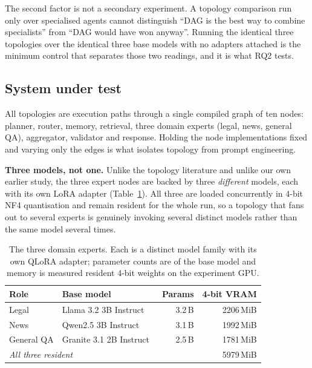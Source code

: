 \documentclass[journal,10pt,compsoc,onecolumn]{IEEEtran}
\begin{document}
The second factor is not a secondary experiment. A topology comparison run only
over specialised agents cannot distinguish ``DAG is the best way to combine
specialists'' from ``DAG would have won anyway''. Running the identical three
topologies over the identical three base models with no adapters attached is the
minimum control that separates those two readings, and it is what RQ2 tests.

\subsection{System under test}
All topologies are execution paths through a single compiled graph of ten nodes:
planner, router, memory, retrieval, three domain experts (legal, news, general
QA), aggregator, validator and response. Holding the node implementations fixed
and varying only the edges is what isolates topology from prompt engineering.

\textbf{Three models, not one.} Unlike the topology literature and unlike our own
earlier study, the three expert nodes are backed by three \emph{different}
models, each with its own LoRA adapter (Table~\ref{tab:experts}). All three are
loaded concurrently in 4-bit NF4 quantisation and remain resident for the whole
run, so a topology that fans out to several experts is genuinely invoking several
distinct models rather than the same model several times.

\begin{table}[t]
\centering
\caption{The three domain experts. Each is a distinct model family with its own
QLoRA adapter; parameter counts are of the base model and memory is measured
resident 4-bit weights on the experiment GPU.}
\label{tab:experts}
\small
\begin{tabular}{llrr}
\toprule
\textbf{Role} & \textbf{Base model} & \textbf{Params} & \textbf{4-bit VRAM} \\
\midrule
Legal      & Llama 3.2 3B Instruct~\cite{grattafiori2024llama3}   & 3.2\,B & 2206\,MiB \\
News       & Qwen2.5 3B Instruct~\cite{qwen2024qwen25}            & 3.1\,B & 1992\,MiB \\
General QA & Granite 3.1 2B Instruct~\cite{granite31}             & 2.5\,B & 1781\,MiB \\
\midrule
\multicolumn{3}{l}{\textit{All three resident}} & 5979\,MiB \\
\bottomrule
\end{tabular}
\end{table}
\end{document}
